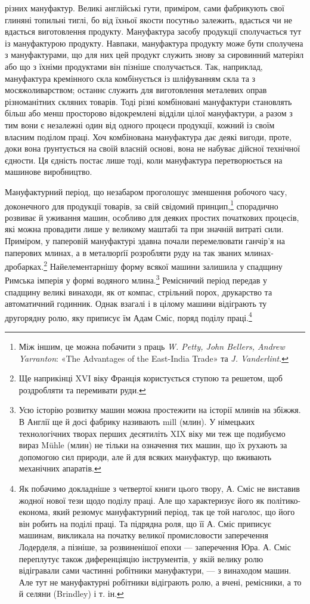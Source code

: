 \parcont{}  %
різних мануфактур. Великі англійські гути, приміром, сами
фабрикують свої глиняні топильні тиглі, бо від їхньої якости
посутньо залежить, вдасться чи не вдасться виготовлення продукту.
Мануфактура засобу продукції сполучається тут із мануфактурою
продукту. Навпаки, мануфактура продукту може бути
сполучена з мануфактурами, що для них цей продукт служить
знову за сировинний матеріял або що з їхніми продуктами він
пізніше сполучається. Так, наприклад, мануфактура кремінного
скла комбінується із шліфуванням скла та з мосяжоливарством;
останнє служить для виготовлення металевих оправ різноманітних
скляних товарів. Тоді різні комбіновані мануфактури
становлять більш або менш просторово відокремлені відділи цілої
мануфактури, а разом з тим вони є незалежні один від одного
процеси продукції, кожний із своїм власним поділом праці. Хоч
комбінована мануфактура дає деякі вигоди, проте, доки вона
ґрунтується на своїй власній основі, вона не набуває дійсної
технічної єдности. Ця єдність постає лише тоді, коли мануфактура
перетворюється на машинове виробництво.

Мануфактурний період, що незабаром проголошує зменшення
робочого часу, доконечного для продукції товарів, за свій свідомий
принцип,\footnote{
Між іншим, це можна побачити з праць \emph{W. Petty, John Bellers,
Andrew Yarranton}: «The Advantages of the East-India Trade» та \emph{J. Vanderlint}.
} спорадично розвиває й уживання машин, особливо
для деяких простих початкових процесів, які можна провадити
лише у великому маштабі та при значній витраті сили. Приміром,
у паперовій мануфактурі здавна почали перемелювати ганчір’я
на паперових млинах, а в металюрґії розробляти руду на так
званих млинах-дробарках.\footnote{
Ще наприкінці XVI віку Франція користується ступою та решетом,
щоб роздробляти та перемивати руди.
} Найелементарнішу форму всякої
машини залишила у спадщину Римська імперія у формі водяного
млина.\footnote{
Усю історію розвитку машин можна простежити на історії млинів
на збіжжя. В Англії ще й досі фабрику називають mill (млин). У
німецьких технологічних творах перших десятиліть XIX віку ми теж
ще подибуємо вираз Mühle (млин) не тільки на означення тих машин,
що їх рухають за допомогою сил природи, але й для всяких мануфактур,
що вживають механічних апаратів.
} Ремісничий період передав у спадщину великі винаходи,
як от компас, стрільний порох, друкарство та автоматичний
годинник. Однак взагалі і в цілому машини відіграють ту другорядну
ролю, яку приписує їм Адам Сміс, поряд поділу праці.\footnote{
Як побачимо докладніше з четвертої книги цього твору, А. Сміс
не виставив жодної нової тези щодо поділу праці. Але що характеризує
його як політико-економа, який резюмує мануфактурний період, так
це той наголос, що його він робить на поділі праці. Та підрядна роля,
що її А. Сміс приписує машинам, викликала на початку великої промисловости
заперечення Лодерделя, а пізніше, за розвиненішої епохи —
заперечення Юра. А. Сміс переплутує також диференціяцію інструментів,
у якій велику ролю відігравали сами частинні робітники мануфактури,
— з винаходом машин. Але тут не мануфактурні робітники
відіграють ролю, а вчені, ремісники, а то й селяни (Brindley) і т. ін.
}
\parbreak{}  %
